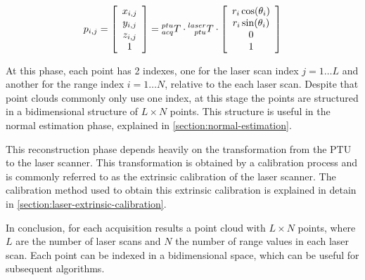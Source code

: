 \begin{equation}\label{eqn:point-registration}
    p_{i,j} = 
    \left[
        \begin{array}{c}
            x_{i,j} \\ y_{i,j} \\ z_{i,j} \\ 1 \\
        \end{array}    
    \right]
    =
    \TF{acq}{ptu}
    \cdot \TF{ptu}{laser}
    \cdot
    \left[
        \begin{array}{c}
            r_i \cos(\theta_i) \\
            r_i \sin(\theta_i) \\
            0 \\
            1 \\
        \end{array}    
    \right]
\end{equation}

At this phase, each point has 2 indexes, one for the laser scan index $j=1\dots L$ and another for the range index $i=1\dots N$, relative to the each laser scan. Despite that point clouds commonly only use one index, at this stage the points are structured in a bidimensional structure of $L \times N$ points. This structure is useful in the normal estimation phase, explained in \cref{section:normal-estimation}.

This reconstruction phase depends heavily on the transformation from the PTU to the laser scanner. This transformation is obtained by a calibration process and is commonly referred to as the extrinsic calibration of the laser scanner. The calibration method used to obtain this extrinsic calibration is explained in detain in \cref{section:laser-extrinsic-calibration}.

In conclusion, for each acquisition results a point cloud with $L \times N$ points, where $L$ are the number of laser scans and $N$ the number of range values in each laser scan. Each point can be indexed in a bidimensional space, which can be useful for subsequent algorithms.
